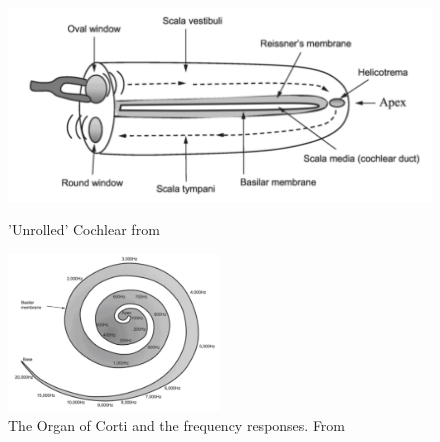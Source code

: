 \documentclass[logo,bsc,singlespacing,parskip,online]{infthesis}
\begin{document}
\begin{figure}[h]
   \centering
   \begin{minipage}{0.4\textwidth}
      \centering
      \includegraphics[width=\textwidth]{wayland-cohlear.png}
      \caption{'Unrolled' Cochlear from \citet{Wayland2018Phonetics}}
      \label{fig:cohlear}
   \end{minipage}
   \hfill
   \begin{minipage}{0.48\textwidth}
      \centering
      \includegraphics[width=0.5\textwidth]{wayland-corti-2.png}
      \caption{The Organ of Corti and the frequency responses. From \citet{Wayland2018Phonetics}}
      \label{fig:corti}
   \end{minipage}
\end{figure}

\end{document}
